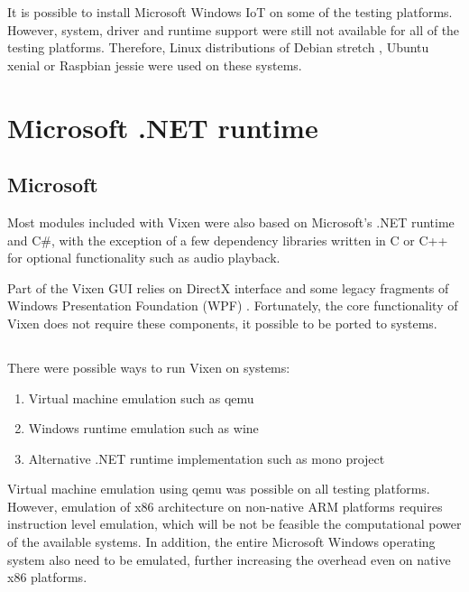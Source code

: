 It is possible to install Microsoft Windows IoT  on some of the testing platforms. However, system, driver and runtime support were still not available for all of the testing platforms. Therefore,  \cite{debian} Linux distributions of Debian stretch \cite{debian}, Ubuntu xenial \cite{ubuntu} or Raspbian jessie \cite{raspbian} were used on these systems.

\section{Microsoft .NET runtime}

\subsection{Microsoft }

Most modules included with Vixen were also based on Microsoft's .NET runtime and C\#, with the exception of a few dependency libraries written in C \cite{kernighan1988c} or C++ \cite{stroustrup1995c++} for optional functionality such as audio playback.

Part of the Vixen GUI relies on  DirectX interface \cite{directx} and some legacy fragments of Windows Presentation Foundation (WPF) \cite{wpf}. Fortunately, the core functionality of Vixen does not require these components,  it possible to be ported to  systems.

\subsection{}

There were  possible ways to run Vixen on  systems:

\begin{enumerate}[noitemsep]
  \item Virtual machine emulation such as qemu \cite{qemu}
  \item Windows runtime emulation such as wine \cite{wine}
  \item Alternative .NET runtime implementation such as mono project \cite{de2004mono}
\end{enumerate}

Virtual machine emulation using qemu was possible on all testing platforms. However, emulation of x86 architecture on non-native ARM platforms requires instruction level emulation, which will be not be feasible  the computational power of the available systems. In addition, the entire Microsoft Windows operating system  also need to be emulated, further increasing the overhead even on native x86 platforms.


